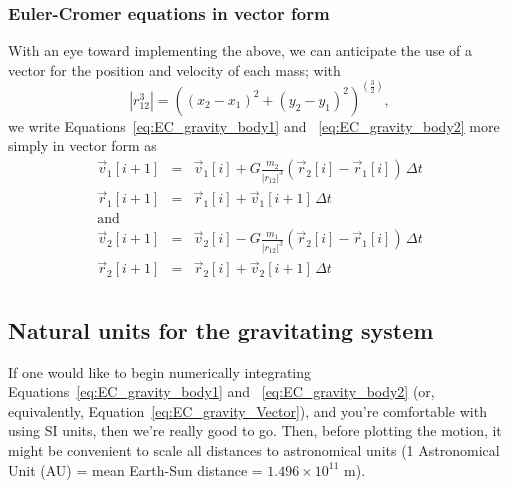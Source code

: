 \subsubsection{Euler-Cromer equations in vector form}
With an eye toward implementing the above, we can anticipate the use of a vector for the position and velocity of each mass; with 
$$  | r_{12}^3 | = \left( (x_2 - x_1)^2 + (y_2 - y_1)^2 \right)^{(\frac{3}{2})} ,  $$
we write Equations~\ref{eq:EC_gravity_body1} and ~\ref{eq:EC_gravity_body2} more simply in vector form as
\begin{eqnarray}
\vec{v}_1[i+1] & = & \vec{v}_1[i] + G\frac{m_2}{ |r_{12}|^3 }\left( \vec{r}_2[i] - \vec{r}_1[i] \right) \,\Delta t \nonumber \\
\vec{r}_1[i+1] & = & \vec{r}_1[i] + \vec{v}_{1}[i+1]\,\Delta t \nonumber \\
\mathrm{and} &   & \nonumber \\[2mm]
\vec{v}_2[i+1] & = & \vec{v}_2[i] - G\frac{m_1}{ |r_{12}|^3 }\left( \vec{r}_2[i] - \vec{r}_1[i] \right) \,\Delta t \nonumber \\
\vec{r}_2[i+1] & = & \vec{r}_2[i] + \vec{v}_{2}[i+1]\,\Delta t \nonumber \\
\label{eq:EC_gravity_Vector}
\end{eqnarray}




\subsection{Natural units for the gravitating system}
If one would like to begin numerically integrating Equations~\ref{eq:EC_gravity_body1} and ~\ref{eq:EC_gravity_body2} (or, equivalently, Equation~\ref{eq:EC_gravity_Vector}), and you're comfortable with using SI units, then we're really good to go. Then, before plotting the motion, it might be convenient to scale all distances to astronomical units (1 Astronomical Unit (AU) =  mean Earth-Sun distance = $1.496\times 10^{11}$ m). 

